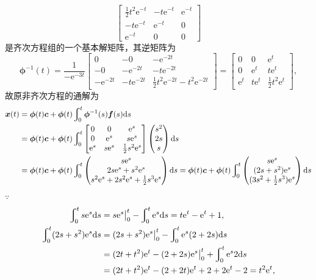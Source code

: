 \documentclass[12pt,UTF8]{ctexart}
\newcommand{\Int}[4]{\varint\nolimits_{#1}^{#2}#3\mathrm d#4}
\newcommand{\me}[0]{\mathrm e}
\begin{document}
\begin{enumerate}
\[\begin{bmatrix}
\frac12t^2\me^{-t}&-t\me^{-t}&\me^{-t}\\-t\me^{-t}&\me^{-t}&0\\\me^{-t}&0&0
\end{bmatrix}\]
是齐次方程组的一个基本解矩阵，其逆矩阵为
\[\bm\phi^{-1}(t)=\frac1{-\me^{-3t}}\begin{bmatrix}
0&-0&-\me^{-2t}\\
-0&-\me^{-2t}&-t\me^{-2t}\\
-\me^{-2t}&-t\me^{-2t}&\frac12t^2\me^{-2t}-t^2\me^{-2t}
\end{bmatrix}=\begin{bmatrix}
0&0&\me^{t}\\
0&\me^{t}&t\me^{t}\\
\me^{t}&t\me^{t}&\frac12t^2\me^{t}
\end{bmatrix},\]
故原非齐次方程的通解为
\[\begin{aligned}
\bm x(t)&=\bm\phi(t)\bm c+\bm\phi(t)\Int0t{\bm\phi^{-1}(s)\bm f(s)}s\\
&=\bm\phi(t)\bm c+\bm\phi(t)\Int0t{\begin{bmatrix}
0&0&\me^{s}\\
0&\me^{s}&s\me^{s}\\
\me^{s}&s\me^{s}&\frac12s^2\me^{s}
\end{bmatrix}\begin{pmatrix}
s^2\\2s\\s
\end{pmatrix}}s\\
&=\bm\phi(t)\bm c+\bm\phi(t)\Int0t{\begin{pmatrix}
s\me^s\\2s\me^s+s^2\me^s\\s^2\me^s+2s^2\me^s+\frac12s^3\me^s
\end{pmatrix}}s=\bm\phi(t)\bm c+\bm\phi(t)\Int0t{\begin{pmatrix}
s\me^s\\(2s+s^2)\me^s\\(3s^2+\frac12s^3)\me^s
\end{pmatrix}}s
\end{aligned}\]
$\because$
\[\begin{aligned}
\Int0t{s\me^s}s&=s\me^s\big|_0^t-\Int0t{\me^s}s=t\me^t-\me^t+1,\\
\Int0t{(2s+s^2)\me^s}s&=(2s+s^2)\me^s\big|_0^t-\Int0t{\me^s(2+2s)}s\\
&=(2t+t^2)\me^t-(2+2s)\me^s\big|_0^t+\Int0t{\me^s2}s\\
&=(2t+t^2)\me^t-(2+2t)\me^t+2+2\me^t-2=t^2\me^t,\\

\end{aligned}\]
\end{enumerate}
\end{document}
